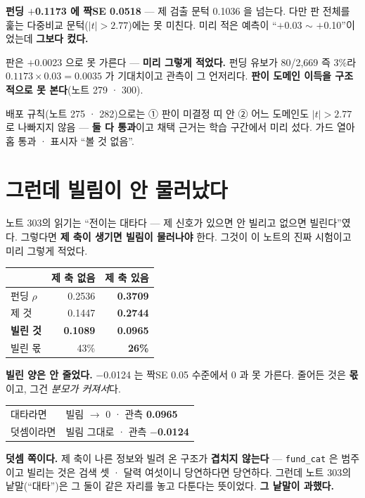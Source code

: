 \documentclass[10pt]{article}
\begin{document}
\textbf{펀딩 $+$0.1173 에 짝SE 0.0518} --- 제 검출 문턱 0.1036 을 넘는다.
다만 판 전체를 훑는 다중비교 문턱($|t|{>}2.77$)에는 못 미친다. 미리 적은
예측이 ``$+$0.03 $\sim$ $+$0.10''이었는데 \textbf{그보다 컸다.}

판은 $+$0.0023 으로 못 가른다 --- \textbf{미리 그렇게 적었다.} 펀딩 유보가
80/2,669 즉 3\%라 $0.1173 \times 0.03 = 0.0035$ 가 기대치이고 관측이 그
언저리다. \textbf{판이 도메인 이득을 구조적으로 못 본다}(노트 279 · 300).

배포 규칙(노트 275 · 282)으로는 ① 판이 미결정 띠 안 ② 어느 도메인도
$|t|{>}2.77$ 로 나빠지지 않음 --- \textbf{둘 다 통과}이고 채택 근거는 학습
구간에서 미리 섰다. 가드 열아홉 통과 · 표시자 ``볼 것 없음''.

\section{그런데 빌림이 안 물러났다}

노트 303의 읽기는 ``전이는 대타다 --- 제 신호가 있으면 안 빌리고 없으면
빌린다''였다. 그렇다면 \textbf{제 축이 생기면 빌림이 물러나야} 한다.
그것이 이 노트의 진짜 시험이고 미리 그렇게 적었다.

\begin{center}\small
\begin{tabular}{lrr}
\hline
& 제 축 없음 & 제 축 있음 \\
\hline
펀딩 $\rho$ & 0.2536 & \textbf{0.3709} \\
\quad 제 것 & 0.1447 & \textbf{0.2744} \\
\quad \textbf{빌린 것} & \textbf{0.1089} & \textbf{0.0965} \\
빌린 몫 & 43\% & \textbf{26\%} \\
\hline
\end{tabular}
\end{center}

\textbf{빌린 양은 안 줄었다.} $-$0.0124 는 짝SE 0.05 수준에서 0 과 못
가른다. 줄어든 것은 \textbf{몫}이고, 그건 \emph{분모가 커져서}다.

\begin{center}\small
\begin{tabular}{ll}
\hline
대타라면 & 빌림 $\to$ 0 · 관측 \textbf{0.0965} \\
덧셈이라면 & 빌림 그대로 · 관측 \textbf{$-$0.0124} \\
\hline
\end{tabular}
\end{center}

\textbf{덧셈 쪽이다.} 제 축이 나른 정보와 빌려 온 구조가 \textbf{겹치지
않는다} --- \texttt{fund\_cat} 은 범주이고 빌리는 것은 검색 셋 · 달력 여섯이니
당연하다면 당연하다. 그런데 노트 303의 낱말(``대타'')은 그 둘이 같은 자리를
놓고 다툰다는 뜻이었다. \textbf{그 낱말이 과했다.}
\end{document}
